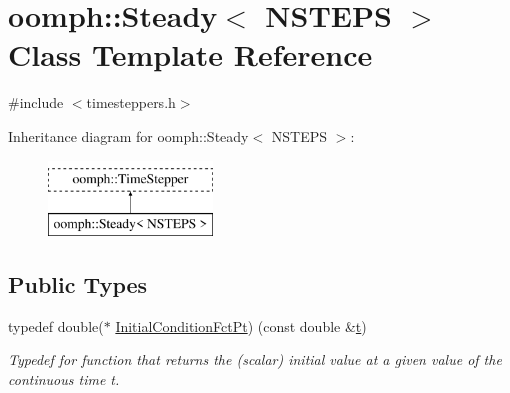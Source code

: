 \hypertarget{classoomph_1_1Steady}{}\section{oomph\+:\+:Steady$<$ N\+S\+T\+E\+PS $>$ Class Template Reference}
\label{classoomph_1_1Steady}


{\ttfamily \#include $<$timesteppers.\+h$>$}

Inheritance diagram for oomph\+:\+:Steady$<$ N\+S\+T\+E\+PS $>$\+:\begin{figure}[H]
\begin{center}
\leavevmode
\includegraphics[height=2.000000cm]{classoomph_1_1Steady}
\end{center}
\end{figure}
\subsection*{Public Types}
\begin{DoxyCompactItemize}
\item 
typedef double($\ast$ \hyperlink{classoomph_1_1Steady_a107849d71562b3efa4bf785de60490b3}{Initial\+Condition\+Fct\+Pt}) (const double \&\hyperlink{cfortran_8h_af6f0bd3dc13317f895c91323c25c2b8f}{t})
\begin{DoxyCompactList}\small\item\em Typedef for function that returns the (scalar) initial value at a given value of the continuous time t. \end{DoxyCompactList}\end{DoxyCompactItemize}
